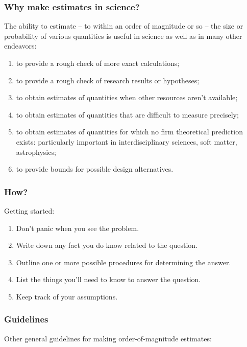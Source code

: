 \subsubsection{Why make estimates in science?}
The ability to estimate -- to within an order of magnitude or so -- the size or probability of various quantities is useful in science as well as in many other endeavors:
%
\begin{enumerate}
\item to provide a rough check of more exact calculations;
%
\item to provide a rough check of research results or hypotheses;
%
\item to obtain estimates of quantities when other resources aren't available;
%
\item to obtain estimates of quantities that are difficult to measure precisely;
%
\item to obtain estimates of quantities for which no firm theoretical prediction exists: particularly important in interdisciplinary sciences, soft matter, astrophysics; 
%
\item to provide bounds for possible design alternatives.
\end{enumerate}


\subsubsection{How?}
Getting started:
\begin{enumerate}
\item Don't panic when you see the problem.
%
\item Write down any fact you do know related to the question.
%
\item Outline one or more possible procedures for determining the answer. 
%
\item List the things you'll need to know to answer the question.
%
\item Keep track of your assumptions.
\end{enumerate}


\subsubsection{Guidelines}
Other general guidelines for making order-of-magnitude estimates:

